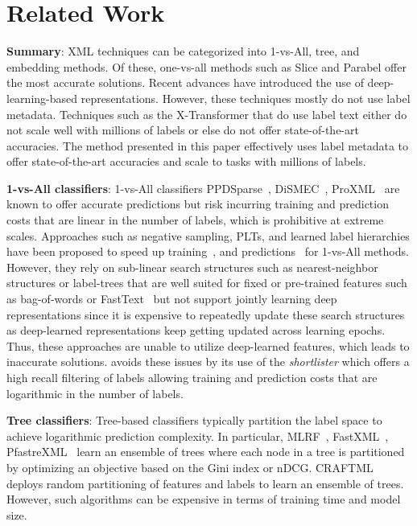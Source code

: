 \section{Related Work}
\label{sec:related}

\textbf{Summary}: XML techniques can be categorized into 1-vs-All, tree, and embedding methods. Of these, one-vs-all methods such as Slice \cite{Jain19} and Parabel \cite{Prabhu18b} offer the most accurate solutions. Recent advances have introduced the use of deep-learning-based representations. However, these techniques mostly do not use label metadata. Techniques such as the X-Transformer \cite{Chang20} that do use label text either do not scale well with millions of labels or else do not offer state-of-the-art accuracies. The \alg method presented in this paper effectively uses label metadata to offer state-of-the-art accuracies and scale to tasks with millions of labels.

\textbf{1-vs-All classifiers}: 1-vs-All classifiers PPDSparse~\citep{Yen17}, DiSMEC~\cite{Babbar17}, ProXML~\cite{Babbar19} are known to offer accurate predictions but risk incurring training and prediction costs that are linear in the number of labels, which is prohibitive at extreme scales. Approaches such as negative sampling, PLTs, and learned label hierarchies have been proposed to speed up training~\citep{Jain19, Khandagale19, Prabhu18b, Yen18a}, and predictions~\citep{Jasinska16, Niculescu17} for 1-vs-All methods. However, they rely on sub-linear search structures such as nearest-neighbor structures or label-trees that are well suited for fixed or pre-trained features such as bag-of-words or FastText~\citep{Joulin17} but not support jointly learning deep representations since it is expensive to repeatedly update these search structures as deep-learned representations keep getting updated across learning epochs. Thus, these approaches are unable to utilize deep-learned features, which leads to inaccurate solutions. \alg avoids these issues by its use of the \emph{shortlister} which offers a high recall filtering of labels allowing training and prediction costs that are logarithmic in the number of labels.

\textbf{Tree classifiers}: Tree-based classifiers typically partition the label space to achieve logarithmic prediction complexity. In particular, MLRF~\citep{Agrawal13}, FastXML~\citep{Prabhu14}, PfastreXML~\citep{Jain16} learn an ensemble of trees where each node in a tree is partitioned by optimizing an objective based on the Gini index or nDCG. CRAFTML~\cite{Siblini18a} deploys random partitioning of features and labels to learn an ensemble of trees. However, such algorithms can be expensive in terms of training time and model size.

